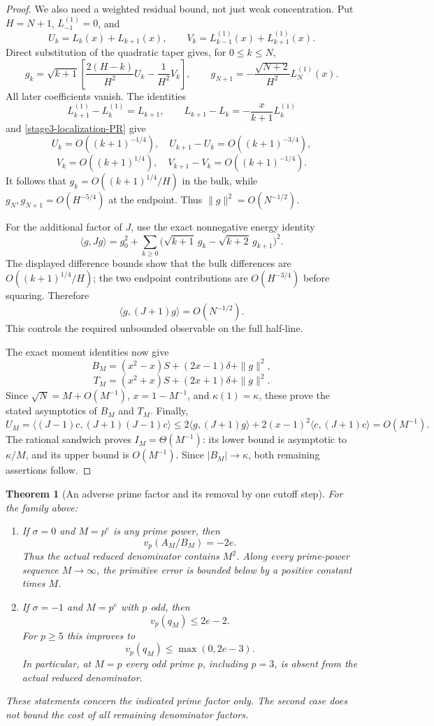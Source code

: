 \documentclass[11pt,a4paper]{article}
\newtheorem{theorem}{Theorem}[section]
\theoremstyle{definition}
\theoremstyle{remark}
\begin{document}
\begin{proof}
We also need a weighted residual bound, not just weak concentration.
Put $H=N+1$, $L_{-1}^{(1)}=0$, and
\[
 U_k=L_k(x)+L_{k+1}(x),\qquad
 V_k=L_{k-1}^{(1)}(x)+L_{k+1}^{(1)}(x).
\]
Direct substitution of the quadratic taper gives, for $0\le k\le N$,
\[
 g_k=\sqrt{k+1}
 \left[\frac{2(H-k)}{H^2}U_k-\frac1{H^2}V_k\right],
 \qquad
 g_{N+1}=-\frac{\sqrt{N+2}}{H^2}L_N^{(1)}(x).
\]
All later coefficients vanish. The identities
\[
 L_{k+1}^{(1)}-L_k^{(1)}=L_{k+1},\qquad
 L_{k+1}-L_k=-\frac{x}{k+1}L_k^{(1)}
\]
and \eqref{stage3-localization-PR} give
\[
 U_k=O((k+1)^{-1/4}),\quad
 U_{k+1}-U_k=O((k+1)^{-3/4}),
\]
\[
 V_k=O((k+1)^{1/4}),\quad
 V_{k+1}-V_k=O((k+1)^{-1/4}).
\]
It follows that $g_k=O((k+1)^{1/4}/H)$ in the bulk, while
$g_N,g_{N+1}=O(H^{-5/4})$ at the endpoint. Thus
$\|g\|^2=O(N^{-1/2})$.

For the additional factor of $J$, use the exact nonnegative energy
identity
\[
 \langle g,Jg\rangle
 =g_0^2+\sum_{k\ge0}
   \bigl(\sqrt{k+1}\,g_k-\sqrt{k+2}\,g_{k+1}\bigr)^2.
\]
The displayed difference bounds show that the bulk differences are
$O((k+1)^{1/4}/H)$; the two endpoint contributions are
$O(H^{-3/4})$ before squaring. Therefore
\begin{equation}
 \langle g,(J+1)g\rangle=O(N^{-1/2}).
 \label{stage3-localization-weighted-residual}
\end{equation}
This controls the required unbounded observable on the full half-line.

The exact moment identities now give
\[
 B_M=(x^2-x)S+(2x-1)\delta+\|g\|^2,
\]
\[
 T_M=(x^2+x)S+(2x+1)\delta+\|g\|^2.
\]
Since $\sqrt N=M+O(M^{-1})$, $x=1-M^{-1}$, and $\kappa(1)=\kappa$,
these prove the stated asymptotics of $B_M$ and $T_M$.
Finally,
\[
 U_M=\langle (J-1)c,(J+1)(J-1)c\rangle
 \le2\langle g,(J+1)g\rangle
      +2(x-1)^2\langle c,(J+1)c\rangle
 =O(M^{-1}).
\]
The rational sandwich proves $I_M=\Theta(M^{-1})$:
its lower bound is asymptotic to $\kappa/M$, and its upper bound is
$O(M^{-1})$. Since $|B_M|\to\kappa$, both remaining assertions follow.
\end{proof}

\begin{theorem}[An adverse prime factor and its removal by one cutoff step]
\label{stage3-localization-primes}
For the family above:
\begin{enumerate}
\item If $\sigma=0$ and $M=p^e$ is any prime power, then
\[
 v_p(A_M/B_M)=-2e.
\]
Thus the actual reduced denominator contains $M^2$. Along every
prime-power sequence $M\to\infty$, the primitive error is bounded below
by a positive constant times $M$.
\item If $\sigma=-1$ and $M=p^e$ with $p$ odd, then
\[
 v_p(q_M)\le2e-2.
\]
For $p\ge5$ this improves to
\[
 v_p(q_M)\le\max(0,2e-3).
\]
In particular, at $M=p$ every odd prime $p$, including $p=3$, is absent
from the actual reduced denominator.
\end{enumerate}
These statements concern the indicated prime factor only. The second
case does not bound the cost of all remaining denominator factors.
\end{theorem}
\end{document}
